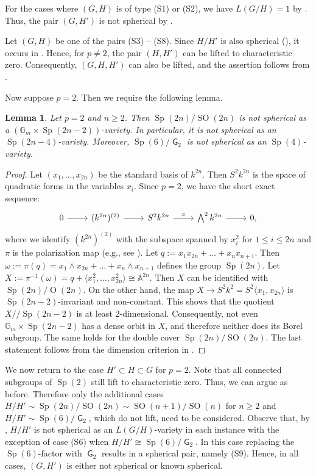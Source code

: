 \documentclass[12pt]{amsart}
\newcommand\BBG{{\mathbb G}}
\renewcommand\mod{{/\!\!/}}
\newcommand\G{{\operatorname{\mathsf G}}}
\newcommand\Gm{{{\BBG}_m}}
\newcommand\Sp{\operatorname{Sp}}
\newcommand\SOO{\operatorname{SO}}
\renewcommand\O{\operatorname{O}}
\numberwithin{equation}{section}
\newtheorem{lemma}[lemma]{Lemma}
\theoremstyle{definition}
\begin{document}
For the cases where $(G,H)$ is of type (S1) or (S2), we have
$L(G/H)=1$ by . Thus, the pair $(G,H')$ is not
spherical by .

Let $(G,H)$ be one of the pairs (S3) -- (S8).  Since $H/H'$ is also
spherical (), it occurs in
.  Hence, for $p \ne 2$, the pair $(H,H')$ can be
lifted to characteristic zero. Consequently, $(G,H,H')$ can also be lifted, and
the assertion follows from .

Now suppose $p =2$. Then we require the following lemma.

\begin{lemma}
  \label{lem:p21}
  Let $p=2$ and $n\geqslant 2$. Then $\Sp(2n)/\SOO(2n)$ is not spherical as
  a $(\Gm \times \Sp(2n-2))$-variety. In particular, it is
  not spherical as an $\Sp(2n-4)$-variety. Moreover, $\Sp(6)/\G_2$ is
  not spherical as an $\Sp(4)$-variety.
\end{lemma}

\begin{proof}
  Let $(x_1, \ldots, x_{2n})$ be the standard basis of $k^{2n}$. Then
  $S^2k^{2n}$ is the space of quadratic forms in the variables $x_i$.  Since
  $p = 2$, we have the short exact sequence:
  \[
    \begin{tikzcd} 0 \arrow{r} & (k^{2n})^{(2)} \arrow{r} & S^2k^{2n}
      \arrow["\pi"]{r} & \bigwedge\nolimits^2 k^{2n} \arrow{r} &
      0,\end{tikzcd}
  \]
  where we identify $(k^{2n})^{(2)}$ with the subspace spanned by
  $x_i^2$ for $1 \leqslant i \leqslant 2n$ and $\pi$ is the polarization map
  (e.g., see \cite[Def.~7.1]{EKM}).  Let
  $q := x_1 x_{2n} + \ldots +x_n x_{n+1}$.  Then
  $\omega := \pi (q) = x_1 \wedge x_{2n} + \ldots +x_n \wedge x_{n+1}$
  defines the group $\Sp(2n)$.  Let
  $X := \pi^{-1}(\omega) = q + \langle x_1^2, \ldots , x_{2n}^2
  \rangle \cong \mathbb{A}^{2n}$. Then $X$ can be identified with
  $\Sp(2n)/\O(2n)$. On the other hand, the map
  $X \to S^2 k^2 = S^2 \langle x_1 , x_{2n} \rangle$ is
  $\Sp(2n-2)$-invariant and non-constant. This shows that the quotient
  $X\mod\Sp(2n-2)$ is at least $2$-dimensional. Consequently, not even
  $\mathbb{G}_m \times \Sp(2n-2)$ has a dense orbit in $X$, and therefore
  neither does its Borel subgroup. The same holds for the double cover
  $\Sp(2n)/\SOO(2n)$.  The last statement follows from the dimension
  criterion in .
\end{proof}

We now return to the case $H'\subset H\subset G$ for $p=2$. Note that
all connected subgroups of $\Sp(2)$ still lift to characteristic
zero. Thus, we can argue as before.  Therefore only the additional
cases $H/H' \sim \Sp(2n)/\SOO(2n)\sim\SOO(n+1)/\SOO(n)$ for $n \geqslant 2$
and $H/H'\sim\Sp(6)/\G_2$, which do not lift, need to be considered.
Observe that, by , $H/H'$ is not spherical as an
$L(G/H)$-variety in each instance with the exception of case (S6) when
$H/H' \cong \Sp(6)/\G_2$.  In this case replacing the $\Sp(6) $-factor
with $\G_2$ results in a spherical pair, namely (S9). Hence, in all
cases, $(G,H')$ is either not spherical or known spherical.
 
\end{document}
